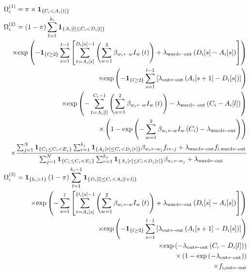 \documentclass[10pt]{article}
\begin{document}
\begin{eqnarray*}
\lefteqn{\Omega_i^{\left(1\right)} = \pi \times \mathbf{1}_{\left\lbrace C_i < A_i[1] \right\rbrace} }\\
\lefteqn{\Omega_i^{\left(2\right)}  = \left( 1-\pi \right) \sum_{l=1}^{k_i} \mathbf{1}_{\left\lbrace A_i[l] \leq C_i < D_i[l] \right\rbrace}}\\
	 && \times \text{exp}\left( - \mathbf{1}_{\left\lbrace l \geq 2 \right\rbrace} \sum_{s=1}^{l-1} \left[ \sum_{t=A_i[s]}^{D_i[s]-1} \left( \sum_{w=1}^{2} \beta_{w_i \leftarrow w} I_w\left(t\right) \right) + \lambda_{\text{ward} \leftarrow \text{out}}\left(D_i[s]-A_i[s]\right) \right] \right) \\
	 && \times \text{exp}\left( - \mathbf{1}_{\left\lbrace l \geq 2 \right\rbrace} \sum_{s=1}^{l-1} \left[ \lambda_{\text{out} \leftarrow \text{out}}\left(A_i[s+1]-D_i[s]\right) \right] \right) \\
	 && \times \text{exp}\left( - \sum_{t=A_i[l]}^{C_i-1} \left( \sum_{w=1}^{2} \beta_{w_i \leftarrow w} I_w\left(t\right) \right) - \lambda_{\text{ward} \leftarrow \text{out}}\left(C_i-A_i[l]\right)  \right) \\
	 && \times \left( 1 - \text{exp}\left( - \sum_{w=1}^{2} \beta_{w_i \leftarrow w} I_w\left(C_i\right) - \lambda_{\text{ward} \leftarrow \text{out}} \right) \right) \\
	 && \times \frac{\sum_{j=1}^N \mathbf{1}_{\left\lbrace C_j \leq C_i < E_j \right\rbrace} \sum_{r=1}^{k_j} \mathbf{1}_{\left\lbrace A_j[r] \leq C_i < D_j[r] \right\rbrace} \beta_{w_i \leftarrow w_j} f_{i \leftarrow j} + \lambda_{\text{ward} \leftarrow \text{out}}f_{\text{i},\text{ward} \leftarrow \text{out}} }{\sum_{j=1}^N \mathbf{1}_{\left\lbrace C_j \leq C_i < E_j \right\rbrace} \sum_{r=1}^{k_j} \mathbf{1}_{\left\lbrace A_j[r] \leq C_i < D_j[r] \right\rbrace} \beta_{w_i \leftarrow w_j} + \lambda_{\text{ward} \leftarrow \text{out}} } \\
\lefteqn{\Omega_i^{\left(3\right)}  = \mathbf{1}_{\left\lbrace k_i > 1 \right\rbrace} \left( 1-\pi \right) \sum_{l=1}^{k_i-1} \mathbf{1}_{\left\lbrace D_i[l] \leq C_i < A_i[l+1] \right\rbrace}}\\
	 && \times \text{exp}\left( - \sum_{s=1}^{l} \left[ \sum_{t=A_i[s]}^{D_i[s]-1} \left( \sum_{w=1}^{2} \beta_{w_i \leftarrow w} I_w\left(t\right) \right) + \lambda_{\text{ward} \leftarrow \text{out}}\left(D_i[s]-A_i[s]\right) \right] \right) \\
	 && \times \text{exp}\left( - \mathbf{1}_{\left\lbrace l \geq 2 \right\rbrace} \sum_{s=1}^{l-1} \left[ \lambda_{\text{out} \leftarrow \text{out}}\left(A_i[s+1]-D_i[s]\right) \right] \right) \\
	 && \times \text{exp}\left( - \lambda_{\text{out} \leftarrow \text{out}}\left(C_i-D_i[l]\right) \right) \\
	 && \times \left( 1 - \text{exp}\left( - \lambda_{\text{out} \leftarrow \text{out}} \right) \right) \\
	 && \times f_{\text{i},\text{out} \leftarrow \text{out}}  \\
\end{eqnarray*}
\bigskip
\end{document}
